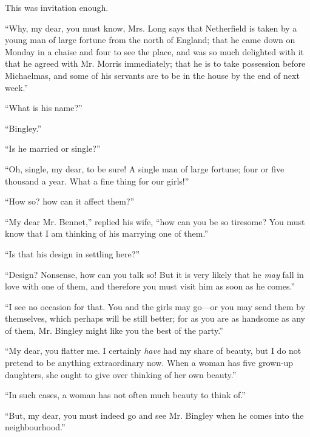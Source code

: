 This was invitation enough.

``Why, my dear, you must know, Mrs. Long says that Netherfield is taken by a young man of large fortune from the north of England; that he came down on Monday in a chaise and four to see the place, and was so much delighted with it that he agreed with Mr. Morris immediately; that he is to take possession before Michaelmas, and some of his servants are to be in the house by the end of next week.''

``What is his name?''

``Bingley.''

``Is he married or single?''

``Oh, single, my dear, to be sure! A single man of large fortune; four or five thousand a year. What a fine thing for our girls!''

``How so? how can it affect them?''

``My dear Mr. Bennet,'' replied his wife, ``how can you be so tiresome? You must know that I am thinking of his marrying one of them.''

``Is that his design in settling here?''

``Design? Nonsense, how can you talk so! But it is very likely that he \textit{may} fall in love with one of them, and therefore you must visit him as soon as he comes.''

``I see no occasion for that. You and the girls may go---or you may send them by themselves, which perhaps will be still better; for as you are as handsome as any of them, Mr. Bingley might like you the best of the party.''

``My dear, you flatter me. I certainly \textit{have} had my share of beauty, but I do not pretend to be anything extraordinary now. When a woman has five grown-up daughters, she ought to give over thinking of her own beauty.''

``In such cases, a woman has not often much beauty to think of.''

``But, my dear, you must indeed go and see Mr. Bingley when he comes into the neighbourhood.''

